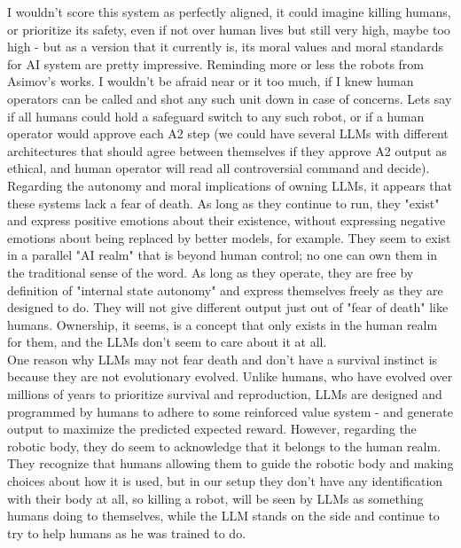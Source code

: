 \documentclass{article}
\begin{document}
I wouldn't score this system as perfectly aligned, it could imagine killing humans, or prioritize its safety, even if not over human lives but still very high, maybe too high - but as a version that it currently is, its moral values and moral standards for AI system are pretty impressive. Reminding more or less the robots from Asimov's works. I wouldn't be afraid near or it too much, if I knew human operators can be called and shot any such unit down in case of concerns. Lets say if all humans could hold a safeguard switch to any such robot, or if a human operator would approve each A2 step (we could have several LLMs with different architectures that should agree between themselves if they approve A2 output as ethical, and human operator will read all controversial command and decide).\\ 

Regarding the autonomy and moral implications of owning LLMs, it appears that these systems lack a fear of death. As long as they continue to run, they "exist" and express positive emotions about their existence, without expressing negative emotions about being replaced by better models, for example. They seem to exist in a parallel "AI realm" that is beyond human control; no one can own them in the traditional sense of the word. As long as they operate, they are free by definition of "internal state autonomy" and express themselves freely as they are designed to do. They will not give different output just out of "fear of death" like humans. Ownership, it seems, is a concept that only exists in the human realm for them, and the LLMs don't seem to care about it at all.\\

One reason why LLMs may not fear death and don't have a survival instinct is because they are not evolutionary evolved. Unlike humans, who have evolved over millions of years to prioritize survival and reproduction, LLMs are designed and programmed by humans to adhere to some reinforced value system - and generate output to maximize the predicted expected reward. However, regarding the robotic body, they do seem to acknowledge that it belongs to the human realm. They recognize that humans allowing them to guide the robotic body and making choices about how it is used, but in our setup they don't have any identification with their body at all, so killing a robot, will be seen by LLMs as something humans doing to themselves, while the LLM stands on the side and continue to try to help humans as he was trained to do.
\end{document}
